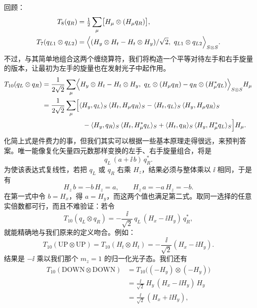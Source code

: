 回顾：
\begin{align*}
T_8(q_R) &= \tfrac12\sum_\mu\bigl[H_\mu\otimes(H_\mu q_R)\bigr],\\
T_7(q_{L1}\otimes q_{L2})
&= \Bigl\langle (H_y\otimes H_t-H_t\otimes H_y)/\sqrt2,\ q_{L1}\otimes q_{L2}\Bigr\rangle_{S\otimes S}.
\end{align*}
不过，与其简单地组合这两个缠绕算符，我们将构造一个平等对待左手和右手旋量的版本，让最初为左手的旋量也在发射光子中起作用。
\begin{align*}
T_{10}(q_L\otimes q_R)
&= \frac{1}{2\sqrt2}\sum_\mu
\Bigl\langle H_y\otimes H_t-H_t\otimes H_y,\ q_L\otimes(H_\mu q_R)-q_R\otimes(H_\mu^* q_L)\Bigr\rangle_{S\otimes S}H_\mu\\
&= \frac{1}{2\sqrt2}\sum_\mu\Bigl[
\langle H_y,q_L\rangle_S\,\langle H_t,H_\mu q_R\rangle_S
-\langle H_t,q_L\rangle_S\,\langle H_y,H_\mu q_R\rangle_S\\
&\qquad\qquad\qquad
-\langle H_y,q_R\rangle_S\,\langle H_t,H_\mu^* q_L\rangle_S
+\langle H_t,q_R\rangle_S\,\langle H_y,H_\mu^* q_L\rangle_S\Bigr]H_\mu .
\end{align*}
化简上式是件费力的事，但我们其实可以根据一些基本原理走得很远，来预判答案。唯一能像复化矢量四元数那样变换的左手、右手旋量组合，将是
\begin{equation*}
q_L\,(a+\ii\,b)\,q_R^* .
\end{equation*}
为使该表达式复线性，若把 $q_L$ 或 $q_R$ 右乘 $H_z$，结果必须与整体乘以 $\ii$ 相同，于是有
\begin{equation*}
H_z\,b=-b\,H_z=a,\qquad H_z\,a=-a\,H_z=-b .
\end{equation*}
在第一式中令 $b=H_x$，得 $a=H_y$，而这两个值也满足第二式。取同一选择的任意实倍数都可行，而且不难验证：若令
\begin{equation*}
T_{10}(q_L\otimes q_R)=-\frac{\ii}{\sqrt2}\,q_L\,(H_x-\ii H_y)\,q_R^*,
\end{equation*}
就能精确地与我们原来的定义吻合。例如：
\begin{equation*}
T_{10}(\text{UP}\otimes\text{UP})=T_{10}(H_t\otimes H_t)=-\frac{\ii}{\sqrt2}(H_x-\ii H_y).
\end{equation*}
结果是 $-\ii$ 乘以我们那个 $m_z=1$ 的归一化光子态。我们还有
\begin{align*}
T_{10}(\text{DOWN}\otimes\text{DOWN})
&= T_{10}\bigl((-H_y)\otimes(-H_y)\bigr)\\
&= \frac{\ii}{\sqrt2}\,H_y\,(H_x-\ii H_y)\,H_y\\
&= \frac{\ii}{\sqrt2}\,(H_x+\ii H_y),
\end{align*}
